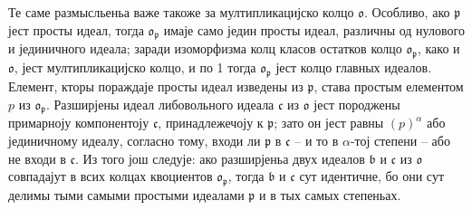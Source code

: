 \documentclass[11pt]{article}
\newcommand{\mo}{\mathfrak{o}}
\newcommand{\mb}{\mathfrak{b}}
\newcommand{\mc}{\mathfrak{c}}
\newcommand{\mpideal}{\mathfrak{p}}
\begin{document}
\setcounter{footnote}{37}

\noindent Те саме размысльеньа важе такоже за мултипликацијско колцо $\mo$. Особливо, ако $\mpideal$ јест просты идеал, тогда $\mo_\mpideal$ имаје само једин просты идеал, различны од нулового и јединичного идеала; заради изоморфизма колц класов остатков колцо $\mo_\mpideal$, како и $\mo$, јест мултипликацијско колцо, и по 1 тогда $\mo_\mpideal$ јест колцо главных идеалов. Елемент, кторы пораждаје просты идеал изведены из $\mpideal$, става простым елементом $p$ из $\mo_\mpideal$. Разширјены идеал либовольного идеала $\mc$ из $\mo$ јест породжены примарноју компонентоју $\mc$, принадлежечоју к $\mpideal$; зато он јест равны $(p)^\alpha$ або јединичному идеалу, согласно тому, входи ли $\mpideal$ в $\mc$ -- и то в $\alpha$-тој степени -- або не входи в $\mc$. Из того још следује: ако разширјеньа двух идеалов $\mb$ и $\mc$ из $\mo$ совпадајут в всих колцах квоциентов $\mo_\mpideal$, тогда $\mb$ и $\mc$ сут идентичне, бо они сут делимы тыми самыми простыми идеалами $\mpideal$ и в тых самых степеньах.
\end{document}
